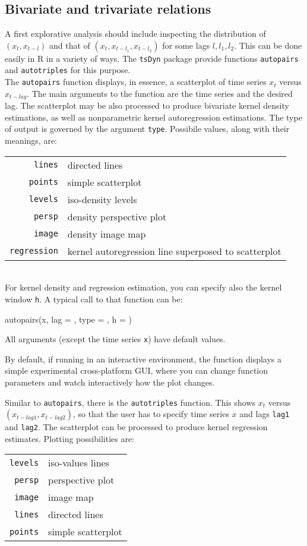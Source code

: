 \documentclass[a4paper]{article}
\newcommand{\tsDyn}{\texttt{tsDyn} }
\begin{document}
\subsection{Bivariate and trivariate relations}
A first explorative analysis should include inspecting the distribution of $(x_t, x_{t-l})$ and that of $(x_t, x_{t-l_1}, x_{t-l_2})$ for some lags $l, l_1, l_2$. This can be done easily in R in a variety of ways. The \tsDyn package provide functions \texttt{autopairs} and \texttt{autotriples} for this purpose.\\
The \texttt{autopairs} function displays, in essence, a scatterplot of time series $x_t$ versus $x_{t-lag}$. The main arguments to the function are the time series and the desired lag. The scatterplot may be also processed to produce bivariate kernel density estimations, as well as nonparametric kernel autoregression estimations. The type of output is governed by the argument \texttt{type}. Possibile values, along with their meanings, are:\\
\begin{tabular}{rl}
\texttt{lines} & directed lines \\
\texttt{points} & simple scatterplot \\
\texttt{levels} & iso-density levels \\
\texttt{persp} & density perspective plot \\
\texttt{image} & density image map \\
\texttt{regression} & kernel autoregression line superposed to scatterplot\\
\end{tabular}
\\For kernel density and regression estimation, you can specify also the kernel window \texttt{h}. 
A typical call to that function can be:
\begin{Schunk}
\begin{Sinput}
 autopairs(x, lag = , type = , h = )
\end{Sinput}
\end{Schunk}
All arguments (except the time series \texttt{x}) have default values.

By default, if running in an interactive environment, the function displays a simple experimental cross-platform GUI, where you can change function parameters and watch interactively how the plot changes.

Similar to \texttt{autopairs}, there is the \texttt{autotriples}
function. This shows $x_t$ versus $(x_{t-lag1}, x_{t-lag2})$, so that
the user has to specify time series $x$ and lags \texttt{lag1} and
\texttt{lag2}. The scatterplot can be processed to produce kernel
regression estimates. Plotting possibilities are:\\
\begin{tabular}{rl} 
\texttt{levels} & iso-values lines\\
\texttt{persp} & perspective plot\\ 
\texttt{image} & image map\\
\texttt{lines} & directed lines \\
\texttt{points} & simple scatterplot \\
\end{tabular}
\end{document}

